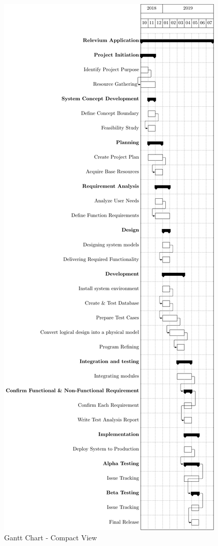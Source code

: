 \documentclass{scrreprt}
\begin{document}
\clearpage
\begin{figure}[ht!]
    
    \hspace{1cm}\includegraphics[height=\textheight]{gantt/gantt_month.pdf}
    \caption{Gantt Chart - Compact View}
    \label{fig:gantt1}
\end{figure}
\end{document}
